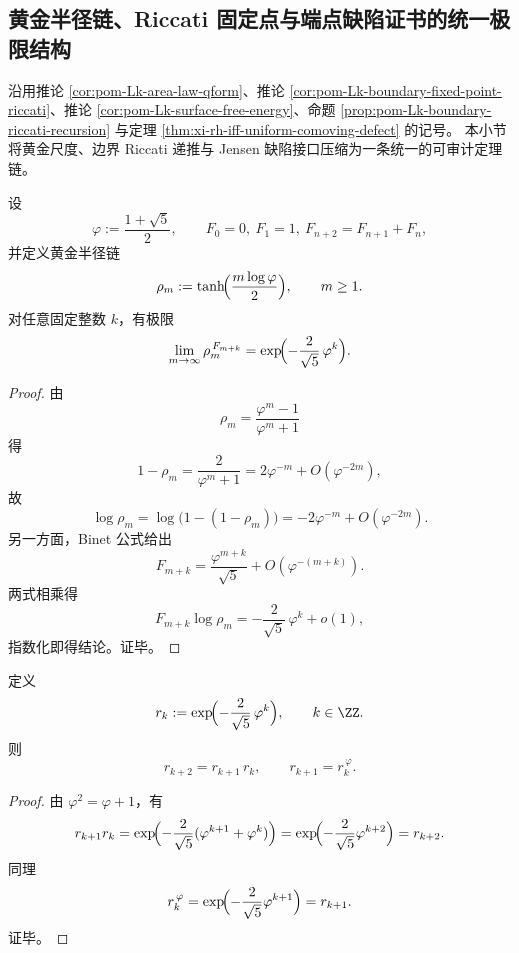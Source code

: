 \subsection{黄金半径链、Riccati 固定点与端点缺陷证书的统一极限结构}\label{subsec:conclusion-golden-radius-riccati-logistic-endpoint-interface}
沿用推论 \ref{cor:pom-Lk-area-law-qform}、推论 \ref{cor:pom-Lk-boundary-fixed-point-riccati}、推论 \ref{cor:pom-Lk-surface-free-energy}、命题 \ref{prop:pom-Lk-boundary-riccati-recursion} 与定理 \ref{thm:xi-rh-iff-uniform-comoving-defect} 的记号。
本小节将黄金尺度、边界 Riccati 递推与 Jensen 缺陷接口压缩为一条统一的可审计定理链。

\begin{theorem}\label{thm:conclusion-golden-radius-fibonacci-neutralization-limit}
设
\[
\varphi:=\frac{1+\sqrt5}{2},
\qquad
F_0=0,\ F_1=1,\ F_{n+2}=F_{n+1}+F_n,
\]
并定义黄金半径链
\[
\rho_m:=\tanh\!\Bigl(\frac{m\log\varphi}{2}\Bigr),\qquad m\ge 1.
\]
对任意固定整数 \(k\)，有极限
\[
\lim_{m\to\infty}\rho_m^{\,F_{m+k}}
=
\exp\!\Bigl(-\frac{2}{\sqrt5}\,\varphi^k\Bigr).
\]
\end{theorem}
\begin{proof}
由
\[
\rho_m=\frac{\varphi^m-1}{\varphi^m+1}
\]
得
\[
1-\rho_m=\frac{2}{\varphi^m+1}=2\varphi^{-m}+O(\varphi^{-2m}),
\]
故
\[
\log \rho_m
=\log\!\bigl(1-(1-\rho_m)\bigr)
=-2\varphi^{-m}+O(\varphi^{-2m}).
\]
另一方面，Binet 公式给出
\[
F_{m+k}=\frac{\varphi^{m+k}}{\sqrt5}+O(\varphi^{-(m+k)}).
\]
两式相乘得
\[
F_{m+k}\log\rho_m
=-\frac{2}{\sqrt5}\,\varphi^k+o(1),
\]
指数化即得结论。证毕。
\end{proof}

\begin{corollary}\label{cor:conclusion-golden-radius-neutralization-multiplicative-recursion}
定义
\[
r_k:=\exp\!\Bigl(-\frac{2}{\sqrt5}\,\varphi^k\Bigr),\qquad k\in\ZZ.
\]
则
\[
r_{k+2}=r_{k+1}\,r_k,
\qquad
r_{k+1}=r_k^{\,\varphi}.
\]
\end{corollary}
\begin{proof}
由 \(\varphi^2=\varphi+1\)，有
\[
r_{k+1}r_k
=\exp\!\Bigl(-\frac{2}{\sqrt5}(\varphi^{k+1}+\varphi^k)\Bigr)
=\exp\!\Bigl(-\frac{2}{\sqrt5}\varphi^{k+2}\Bigr)
=r_{k+2}.
\]
同理
\[
r_k^{\,\varphi}
=\exp\!\Bigl(-\frac{2}{\sqrt5}\varphi^{k+1}\Bigr)
=r_{k+1}.
\]
证毕。
\end{proof}

